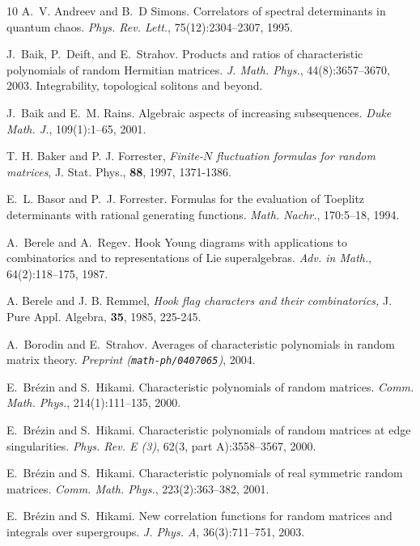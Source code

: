 \documentclass[11pt]{amsart}
\begin{document}
\begin{thebibliography}{10}
A.~V. Andreev and B.~D Simons. {\newblock}Correlators of
spectral determinants in quantum chaos. {\newblock} \textit{Phys.
Rev. Lett.}, 75(12):2304--2307, 1995.

J.~Baik, P.~Deift, and E.~Strahov. {\newblock}Products and
ratios of characteristic polynomials of random Hermitian matrices.
{\newblock} \textit{J. Math. Phys.}, 44(8):3657--3670, 2003.
{\newblock}Integrability, topological solitons and beyond.

J.~Baik and E.~M. Rains. {\newblock}Algebraic aspects of
increasing subsequences. {\newblock} \textit{Duke Math. J.},
109(1):1--65, 2001.


T. H. Baker and P. J. Forrester, \emph{Finite-$N$ fluctuation
formulas for random matrices}, J. Stat. Phys., \textbf{88}, 1997,
1371-1386.

E.~L. Basor and P.~J. Forrester. {\newblock}Formulas for
the evaluation of Toeplitz determinants with rational generating
functions. {\newblock} \textit{Math. Nachr.}, 170:5--18, 1994.

A.~Berele and A.~Regev. {\newblock}Hook Young diagrams with
applications to combinatorics and to representations of Lie
superalgebras. {\newblock} \textit{Adv. in Math.}, 64(2):118--175,
1987.


A. Berele and J. B. Remmel, \emph{Hook flag characters and their
combinatorics,} J. Pure Appl. Algebra, \textbf{35}, 1985, 225-245.

A.~Borodin and E.~Strahov. {\newblock}Averages of
characteristic polynomials in random matrix theory. {\newblock}
\textit{Preprint (\texttt{math-ph/0407065})}, 2004.

E.~Br\'ezin and S.~Hikami. {\newblock}Characteristic
polynomials of random matrices. {\newblock} \textit{Comm. Math.
Phys.}, 214(1):111--135, 2000.

E.~Br\'ezin and S.~Hikami. {\newblock}Characteristic
polynomials of random matrices at edge singularities. {\newblock}
\textit{Phys. Rev. E (3)}, 62(3, part A):3558--3567, 2000.

E.~Br\'ezin and S.~Hikami. {\newblock}Characteristic
polynomials of real symmetric random matrices. {\newblock}
\textit{Comm. Math. Phys.}, 223(2):363--382, 2001.

E.~Br\'ezin and S.~Hikami. {\newblock}New correlation
functions for random matrices and integrals over supergroups.
{\newblock} \textit{J. Phys. A}, 36(3):711--751, 2003.


\end{thebibliography}
\end{document}
